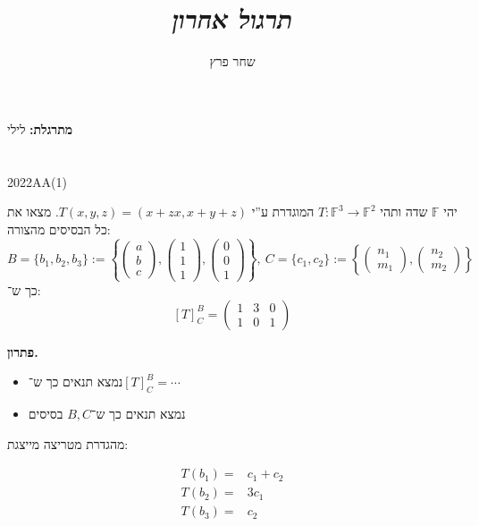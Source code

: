 \documentclass[]{article}
\author{שחר פרץ}
\title{\textit{תרגול אחרון}}
\newcommand\sen   {\begin{otherlanguage}{english}}
\newcommand\she   {\end{otherlanguage}}
\newcommand\F         {\mathbb{F}}
\newcommand\co        {\colon}
\newcommand\pms[1]    {\begin{pmatrix}
		#1
\end{pmatrix}}
\newcommand\ccb[1]    {\left \{ #1 \right \}}
\theoremstyle{definition}
\begin{document}
	\maketitle
	\textbf{מתרגלת: }לילי
	
	\section{}
	2022AA(1)
	
	יהי $\F$ שדה ותהי $T \co \F^3 \to \F^2$ המוגדרת ע''י $T(x, y, z) = (x + zx, x + y + z)$. מצאו את כל הבסיסים מהצורה: 
	\[ B = \{b_1, b_2, b_3\} := \ccb{\pms{a \\ b \\c}  , \pms{1 \\ 1 \\ 1}, \pms{0 \\ 0 \\1}}, \ C = \{c_1, c_2\} := \ccb{\pms{n_1 \\ m_1}, \pms{n_2 \\ m_2}} \]
	כך ש־: 
	\[ [T]^{B}_C = \pms{1 & 3 & 0 \\ 1 & 0 & 1} \]
	
	\textbf{פתרון. }
	\begin{itemize}
		\item נמצא תנאים כך ש־$[T]^{B}_C = \cdots$
		\item נמצא תנאים כך ש־$B, C$ בסיסים
	\end{itemize}
	מהגדרת מטריצה מייצגת: 
	\sen\begin{align}
		T(b_1) =& c_1 + c_2 \\ T(b_2) =& 3c_1 \\ T(b_3) =& c_2
	\end{align}\she
	
\end{document}

